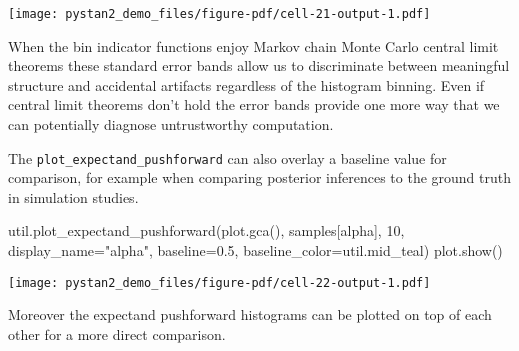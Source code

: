 \documentclass[
  letterpaper,
  DIV=11,
  numbers=noendperiod]{scrartcl}
\newenvironment{Shaded}{\begin{snugshade}}{\end{snugshade}}
\newcommand{\DecValTok}[1]{\textcolor[rgb]{0.68,0.00,0.00}{#1}}
\newcommand{\FloatTok}[1]{\textcolor[rgb]{0.68,0.00,0.00}{#1}}
\newcommand{\NormalTok}[1]{\textcolor[rgb]{0.00,0.23,0.31}{#1}}
\newcommand{\OperatorTok}[1]{\textcolor[rgb]{0.37,0.37,0.37}{#1}}
\newcommand{\StringTok}[1]{\textcolor[rgb]{0.13,0.47,0.30}{#1}}
\begin{document}
\texttt{[image: pystan2\_demo\_files/figure-pdf/cell-21-output-1.pdf]}

When the bin indicator functions enjoy Markov chain Monte Carlo central
limit theorems these standard error bands allow us to discriminate
between meaningful structure and accidental artifacts regardless of the
histogram binning. Even if central limit theorems don't hold the error
bands provide one more way that we can potentially diagnose
untrustworthy computation.

The \texttt{plot\_expectand\_pushforward} can also overlay a baseline
value for comparison, for example when comparing posterior inferences to
the ground truth in simulation studies.

\begin{Shaded}
\begin{Highlighting}[]
\NormalTok{util.plot\_expectand\_pushforward(plot.gca(), samples[}\StringTok{\textquotesingle{}alpha\textquotesingle{}}\NormalTok{],}
                                \DecValTok{10}\NormalTok{, display\_name}\OperatorTok{=}\StringTok{"alpha"}\NormalTok{,}
\NormalTok{                                baseline}\OperatorTok{=}\FloatTok{0.5}\NormalTok{,}
\NormalTok{                                baseline\_color}\OperatorTok{=}\NormalTok{util.mid\_teal)}
\NormalTok{plot.show()}
\end{Highlighting}
\end{Shaded}

\texttt{[image: pystan2\_demo\_files/figure-pdf/cell-22-output-1.pdf]}

Moreover the expectand pushforward histograms can be plotted on top of
each other for a more direct comparison.
\end{document}
